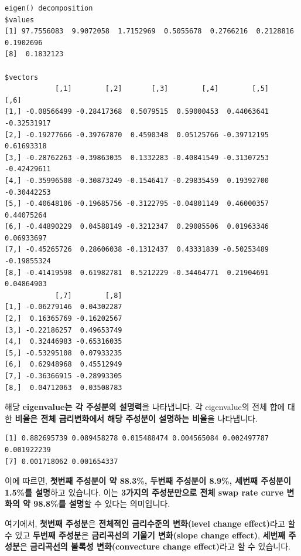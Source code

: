 \documentclass[
  a4paper,
  DIV=11,
  numbers=noendperiod]{scrreprt}
\newenvironment{Shaded}{\begin{snugshade}}{\end{snugshade}}
\newcommand{\FunctionTok}[1]{\textcolor[rgb]{0.28,0.35,0.67}{#1}}
\newcommand{\NormalTok}[1]{\textcolor[rgb]{0.00,0.23,0.31}{#1}}
\newcommand{\OtherTok}[1]{\textcolor[rgb]{0.00,0.23,0.31}{#1}}
\newcommand{\SpecialCharTok}[1]{\textcolor[rgb]{0.37,0.37,0.37}{#1}}
\begin{document}
\begin{verbatim}
eigen() decomposition
$values
[1] 97.7556083  9.9072058  1.7152969  0.5055678  0.2766216  0.2128816  0.1902696
[8]  0.1832123

$vectors
            [,1]        [,2]       [,3]        [,4]        [,5]        [,6]
[1,] -0.08566499 -0.28417368  0.5079515  0.59000453  0.44063641 -0.32531917
[2,] -0.19277666 -0.39767870  0.4590348  0.05125766 -0.39712195  0.61693318
[3,] -0.28762263 -0.39863035  0.1332283 -0.40841549 -0.31307253 -0.42429611
[4,] -0.35996508 -0.30873249 -0.1546417 -0.29835459  0.19392700 -0.30442253
[5,] -0.40648106 -0.19685756 -0.3122795 -0.04801149  0.46000357  0.44075264
[6,] -0.44890229  0.04588149 -0.3212347  0.29085506  0.01963346  0.06933697
[7,] -0.45265726  0.28606038 -0.1312437  0.43331839 -0.50253489 -0.19855324
[8,] -0.41419598  0.61982781  0.5212229 -0.34464771  0.21904691  0.04864903
            [,7]        [,8]
[1,] -0.06279146  0.04302287
[2,]  0.16365769 -0.16202567
[3,] -0.22186257  0.49653749
[4,]  0.32446983 -0.65316035
[5,] -0.53295108  0.07933235
[6,]  0.62948968  0.45512949
[7,] -0.36366915 -0.28993305
[8,]  0.04712063  0.03508783
\end{verbatim}

해당 \textbf{eigenvalue는 각 주성분의 설명력}을 나타냅니다. 각
eigenvalue의 전체 합에 대한 \textbf{비율은 전체 금리변화에서 해당
주성분이 설명하는 비율}을 나타냅니다.

\begin{Shaded}
\end{Shaded}

\begin{verbatim}
[1] 0.882695739 0.089458278 0.015488474 0.004565084 0.002497787 0.001922239
[7] 0.001718062 0.001654337
\end{verbatim}

이에 따르면, \textbf{첫번째 주성분이 약 88.3\%, 두번째 주성분이 8.9\%,
세번째 주성분이 1.5\%를 설명}하고 있습니다. 이는 \textbf{3가지의
주성분만으로 전체 swap rate curve 변화의 약 98.8\%를 설명}할 수 있다는
의미입니다.

여기에서, \textbf{첫번째 주성분}은 \textbf{전체적인 금리수준의
변화(level change effect)}라고 할 수 있고 \textbf{두번째 주성분}은
\textbf{금리곡선의 기울기 변화(slope change effect)}, \textbf{세번째
주성분}은 \textbf{금리곡선의 볼록성 변화(convecture change effect)}라고
할 수 있습니다.
\end{document}
